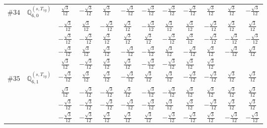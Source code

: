 \documentclass[fleqn,9pt,landscape]{jsarticle}
\begin{document}
\begin{center}
\begin{longtable}{lcccccccccc}
$ \#34\quad \mathbb{Q}_{6,0}^{(s,T_{1g})} $ & $ \frac{\sqrt{3}}{12} $ & $ - \frac{\sqrt{3}}{12} $ & $ \frac{\sqrt{3}}{12} $ & $ - \frac{\sqrt{3}}{12} $ & $ - \frac{\sqrt{3}}{12} $ & $ - \frac{\sqrt{3}}{12} $ & $ - \frac{\sqrt{3}}{12} $ & $ \frac{\sqrt{3}}{12} $ & $ \frac{\sqrt{3}}{12} $ & $ - \frac{\sqrt{3}}{12} $ \\
& $ - \frac{\sqrt{3}}{12} $ & $ \frac{\sqrt{3}}{12} $ & $ - \frac{\sqrt{3}}{12} $ & $ \frac{\sqrt{3}}{12} $ & $ - \frac{\sqrt{3}}{12} $ & $ \frac{\sqrt{3}}{12} $ & $ \frac{\sqrt{3}}{12} $ & $ - \frac{\sqrt{3}}{12} $ & $ \frac{\sqrt{3}}{12} $ & $ \frac{\sqrt{3}}{12} $ \\
& $ - \frac{\sqrt{3}}{12} $ & $ - \frac{\sqrt{3}}{12} $ & $ \frac{\sqrt{3}}{12} $ & $ \frac{\sqrt{3}}{12} $ & $ \frac{\sqrt{3}}{12} $ & $ - \frac{\sqrt{3}}{12} $ & $ \frac{\sqrt{3}}{12} $ & $ - \frac{\sqrt{3}}{12} $ & $ - \frac{\sqrt{3}}{12} $ & $ - \frac{\sqrt{3}}{12} $ \\
& $ - \frac{\sqrt{3}}{12} $ & $ \frac{\sqrt{3}}{12} $ & $ \frac{\sqrt{3}}{12} $ & $ - \frac{\sqrt{3}}{12} $ & $ - \frac{\sqrt{3}}{12} $ & $ \frac{\sqrt{3}}{12} $ & $ - \frac{\sqrt{3}}{12} $ & $ \frac{\sqrt{3}}{12} $ & $ - \frac{\sqrt{3}}{12} $ & $ \frac{\sqrt{3}}{12} $ \\
& $ \frac{\sqrt{3}}{12} $ & $ - \frac{\sqrt{3}}{12} $ & $ \frac{\sqrt{3}}{12} $ & $ \frac{\sqrt{3}}{12} $ & $ - \frac{\sqrt{3}}{12} $ & $ - \frac{\sqrt{3}}{12} $ & $ \frac{\sqrt{3}}{12} $ & $ \frac{\sqrt{3}}{12} $ & $  $ & $  $ \\ \hline
$ \#35\quad \mathbb{Q}_{6,1}^{(s,T_{1g})} $ & $ - \frac{\sqrt{3}}{12} $ & $ \frac{\sqrt{3}}{12} $ & $ \frac{\sqrt{3}}{12} $ & $ - \frac{\sqrt{3}}{12} $ & $ \frac{\sqrt{3}}{12} $ & $ \frac{\sqrt{3}}{12} $ & $ - \frac{\sqrt{3}}{12} $ & $ - \frac{\sqrt{3}}{12} $ & $ \frac{\sqrt{3}}{12} $ & $ \frac{\sqrt{3}}{12} $ \\
& $ \frac{\sqrt{3}}{12} $ & $ - \frac{\sqrt{3}}{12} $ & $ - \frac{\sqrt{3}}{12} $ & $ \frac{\sqrt{3}}{12} $ & $ - \frac{\sqrt{3}}{12} $ & $ - \frac{\sqrt{3}}{12} $ & $ \frac{\sqrt{3}}{12} $ & $ \frac{\sqrt{3}}{12} $ & $ \frac{\sqrt{3}}{12} $ & $ \frac{\sqrt{3}}{12} $ \\
& $ - \frac{\sqrt{3}}{12} $ & $ - \frac{\sqrt{3}}{12} $ & $ - \frac{\sqrt{3}}{12} $ & $ - \frac{\sqrt{3}}{12} $ & $ - \frac{\sqrt{3}}{12} $ & $ \frac{\sqrt{3}}{12} $ & $ \frac{\sqrt{3}}{12} $ & $ - \frac{\sqrt{3}}{12} $ & $ \frac{\sqrt{3}}{12} $ & $ \frac{\sqrt{3}}{12} $ \\
& $ - \frac{\sqrt{3}}{12} $ & $ - \frac{\sqrt{3}}{12} $ & $ \frac{\sqrt{3}}{12} $ & $ \frac{\sqrt{3}}{12} $ & $ \frac{\sqrt{3}}{12} $ & $ - \frac{\sqrt{3}}{12} $ & $ - \frac{\sqrt{3}}{12} $ & $ \frac{\sqrt{3}}{12} $ & $ - \frac{\sqrt{3}}{12} $ & $ - \frac{\sqrt{3}}{12} $ \\

\end{longtable}
\end{center}
\end{document}
